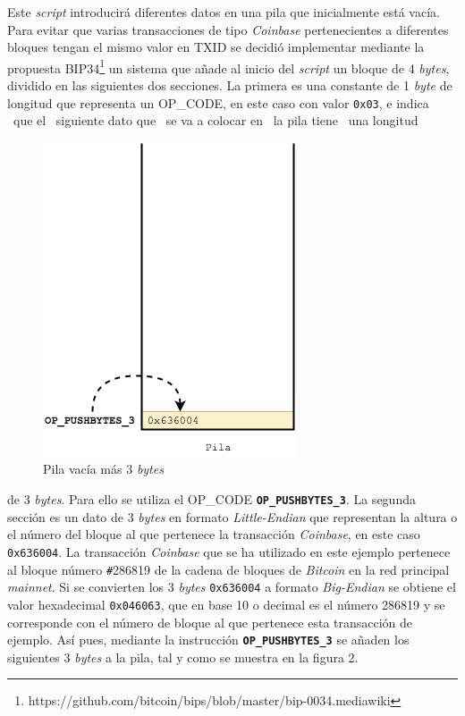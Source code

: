 \documentclass{article}
\begin{document}
    Este \textit{script} introducirá diferentes datos en una pila que inicialmente está vacía. Para evitar que varias transacciones de tipo \textit{Coinbase} pertenecientes a diferentes bloques tengan el mismo valor en TXID se decidió implementar mediante la propuesta BIP34\footnote{https://github.com/bitcoin/bips/blob/master/bip-0034.mediawiki} un sistema que añade al inicio del \textit{script} un bloque de 4 \textit{bytes}, dividido en las siguientes dos secciones. La primera es una constante de 1 \textit{byte} de longitud que representa un OP\_CODE, en este caso con valor \texttt{0x03}, e indica \ que el \ siguiente dato que \ se va a colocar en \ la pila tiene \ una longitud
    
    \vspace{1mm}
    
    \noindent
    \begin{minipage}{0.50\textwidth}
        \begin{figure}[H]
        \centering
            \includegraphics[scale=0.57]{img/Bitcoin_transactions_stack_01.png}
            \caption{Pila vacía más 3 \textit{bytes}}
        \end{figure}
    \end{minipage}
    \hfill
    \begin{minipage}{0.50\textwidth}
        de 3 \textit{bytes}. Para ello se utiliza el OP\_CODE \textbf{\texttt{OP\_PUSHBYTES\_3}}. La segunda sección es un dato de 3 \textit{bytes} en formato \textit{Little-Endian} que representan la altura o el número del bloque al que pertenece la transacción \textit{Coinbase}, en este caso \texttt{0x636004}. La transacción \textit{Coinbase} que se ha utilizado en este ejemplo pertenece al bloque número \texttt{\#}286819 de la cadena de bloques de \textit{Bitcoin} en la red principal \textit{mainnet}. Si se convierten los 3 \textit{bytes} \texttt{0x636004} a formato \textit{Big-Endian} se obtiene el valor hexadecimal \texttt{0x046063}, que en base 10 o decimal es el número 286819 y se corresponde con el número de bloque al que pertenece esta transacción de ejemplo. Así pues, mediante la instrucción \textbf{\texttt{OP\_PUSHBYTES\_3}} se añaden los siguientes 3 \textit{bytes} a la pila, tal y como se muestra en la figura 2.
    \end{minipage}
    
\end{document}
